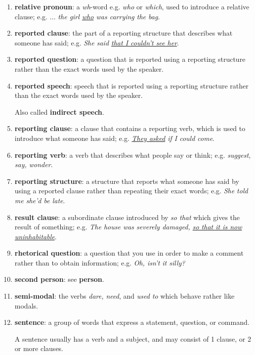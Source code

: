 \documentclass[oneside]{book}
\numberwithin{equation}{section}
\begin{document}
\begin{enumerate}
    See also \textbf{defining relative clause} and \textbf{non-defining relative clause}.
    \item \textbf{relative pronoun}: a \textit{wh}-word e.g. \textit{who} or \textit{which}, used to introduce a relative clause; e.g. \textit{$\ldots$ the girl \underline{who} was carrying the bag}.
    \item \textbf{reported clause}: the part of a reporting structure that describes what someone has said; e.g. \textit{She said \underline{that I couldn't see her}}.
    \item \textbf{reported question}: a question that is reported using a reporting structure rather than the exact words used by the speaker.
    \item \textbf{reported speech}: speech that is reported using a reporting structure rather than the exact words used by the speaker.
    
    Also called \textbf{indirect speech}.
    \item \textbf{reporting clause}: a clause that contains a reporting verb, which is used to introduce what someone has said; e.g. \textit{\underline{They asked} if I could come}.
    \item \textbf{reporting verb}: a verb that describes what people say or think; e.g. \textit{suggest, say, wonder}.
    \item \textbf{reporting structure}: a structure that reports what someone has said by using a reported clause rather than repeating their exact words; e.g. \textit{She told me she'd be late}.
    \item \textbf{result clause}: a subordinate clause introduced by \textit{so that} which gives the result of something; e.g. \textit{The house was severely damaged, \underline{so that it is now uninhabitable}}.
    \item \textbf{rhetorical question}: a question that you use in order to make a comment rather than to obtain information; e.g. \textit{Oh, isn't it silly?}
    \item \textbf{second person}: see \textbf{person}.
    \item \textbf{semi-modal}: the verbs \textit{dare, need}, and \textit{used to} which behave rather like modals.
    \item \textbf{sentence}: a group of words that express a statement, question, or command.
    
    A sentence usually has a verb and a subject, and may consist of 1 clause, or 2 or more clauses.
    

\end{enumerate}
\end{document}
